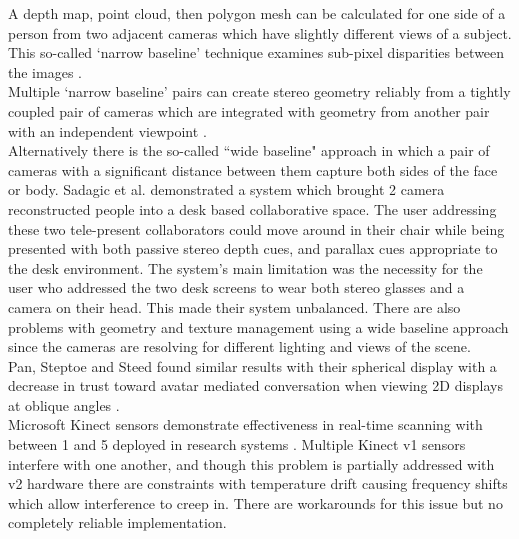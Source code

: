 A depth map, point cloud, then polygon mesh can be calculated for one side of a person from two adjacent cameras which have slightly different views of a subject.  This so-called `narrow baseline' technique examines sub-pixel disparities between the images \cite{Knoblauch2008}. \\
Multiple `narrow baseline' pairs can create stereo geometry reliably from a tightly coupled pair of cameras which are integrated with geometry from another pair with an independent viewpoint \cite{Okutomi:1993ez, Cooke2002, Cooke2002a}. \\
Alternatively there is the so-called ``wide baseline" approach in which a pair of cameras with a significant distance between them capture both sides of the face or body. Sadagic et al. demonstrated a system which brought 2 camera reconstructed \cite{Sadagic2001} people into a desk based collaborative space. The user addressing these two tele-present collaborators could move around in their chair while being presented with both passive stereo depth cues, and parallax cues appropriate to the desk environment. The system's main limitation was the necessity for the user who addressed the two desk screens to wear both stereo glasses and a camera on their head. This made their system unbalanced.  There are also problems with geometry and texture management using a wide baseline approach since the cameras are resolving for different lighting and views of the scene.\\
      Pan, Steptoe and Steed found similar results with their spherical display with a decrease in trust toward avatar mediated conversation when viewing 2D displays at oblique angles \cite{pan2014comparing}.\\
Microsoft Kinect sensors demonstrate effectiveness in real-time scanning with between 1 and 5 deployed in research systems \cite{Mekuria2013}. Multiple Kinect v1 sensors interfere with one another, and though this problem is partially addressed with v2 hardware there are constraints with temperature drift causing frequency shifts which allow interference to creep in. There are workarounds for this issue but no completely reliable implementation.\\

